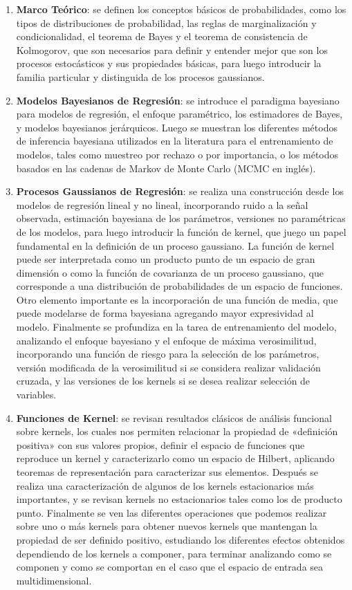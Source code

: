 \begin{enumerate}
	\item \textbf{Marco Teórico}: se definen los conceptos básicos de probabilidades, como los tipos de distribuciones de probabilidad, las reglas de marginalización y condicionalidad, el teorema de Bayes y el teorema de consistencia de Kolmogorov, que son necesarios para definir y entender mejor que son los procesos estocásticos y sus propiedades básicas, para luego introducir la familia particular y distinguida de los procesos gaussianos.
	
	\item \textbf{Modelos Bayesianos de Regresión}: se introduce el paradigma bayesiano para modelos de regresión, el enfoque paramétrico, los estimadores de Bayes, y modelos bayesianos jerárquicos. Luego se muestran los diferentes métodos de inferencia bayesiana utilizados en la literatura para el entrenamiento de modelos, tales como muestreo por rechazo o por importancia, o los métodos basados en las cadenas de Markov de Monte Carlo (MCMC en inglés).
	
	\item \textbf{Procesos Gaussianos de Regresión}: se realiza una construcción desde los modelos de regresión lineal y no lineal, incorporando ruido a la señal observada, estimación bayesiana de los parámetros, versiones no paramétricas de los modelos, para luego introducir la función de kernel, que juego un papel fundamental en la definición de un proceso gaussiano. La función de kernel puede ser interpretada como un producto punto de un espacio de gran dimensión o como la función de covarianza de un proceso gaussiano, que corresponde a una distribución de probabilidades de un espacio de funciones. Otro elemento importante es la incorporación de una función de media, que puede modelarse de forma bayesiana agregando mayor expresividad al modelo. Finalmente se profundiza en la tarea de entrenamiento del modelo, analizando el enfoque bayesiano y el enfoque de máxima verosimilitud, incorporando una función de riesgo para la selección de los parámetros, versión modificada de la verosimilitud si se considera realizar validación cruzada, y las versiones de los kernels si se desea realizar selección de variables.
	
	\item \textbf{Funciones de Kernel}: se revisan resultados clásicos de análisis funcional sobre kernels, los cuales nos permiten relacionar la propiedad de «definición positiva» con sus valores propios, definir el espacio de funciones que reproduce un kernel y caracterizarlo como un espacio de Hilbert, aplicando teoremas de representación para caracterizar sus elementos. Después se realiza una caracterización de algunos de los kernels estacionarios más importantes, y se revisan kernels no estacionarios tales como los de producto punto. Finalmente se ven las diferentes operaciones que podemos realizar sobre uno o más kernels para obtener nuevos kernels que mantengan la propiedad de ser definido positivo, estudiando los diferentes efectos obtenidos dependiendo de los kernels a componer, para terminar analizando como se componen y como se comportan en el caso que el espacio de entrada sea multidimensional.
	

\end{enumerate}
